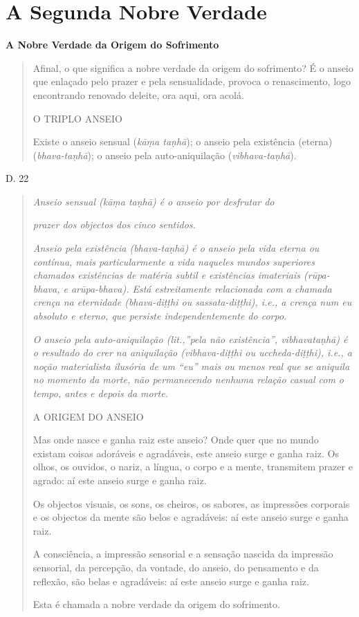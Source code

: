 \chapter{A Segunda Nobre Verdade}

\textbf{A Nobre Verdade da Origem do Sofrimento}

\begin{quote}
Afinal, o que significa a nobre verdade da origem do sofrimento? É o anseio que enlaçado pelo prazer e pela sensualidade, provoca o renascimento, logo encontrando renovado deleite, ora aqui, ora acolá.

O TRIPLO ANSEIO

Existe o anseio sensual (\emph{kāṃa taṇhā}); o anseio pela existência (eterna) (\emph{bhava-taṇhā}); o anseio pela auto-aniquilação (\emph{vibhava-taṇhā}).
\end{quote}

D. 22

\begin{quote}
\emph{Anseio sensual (kāṃa taṇhā) é o anseio por desfrutar do}

\emph{prazer dos objectos dos cinco sentidos.}

\emph{Anseio pela existência (bhava-taṇhā) é o anseio pela vida eterna ou contínua, mais particularmente a vida naqueles mundos superiores chamados existências de matéria subtil e existências imateriais (rūpa-bhava, e arūpa-bhava). Está estreitamente relacionada com a chamada crença na eternidade (bhava-diṭṭhi ou sassata-diṭṭhi), i.e., a crença num eu absoluto e eterno, que persiste independentemente do corpo.}

\emph{O anseio pela auto-aniquilação (lit.,''pela não existência'', vibhavataṇhā) é o resultado do crer na aniquilação (vibhava-diṭṭhi ou uccheda-diṭṭhi), i.e., a noção materialista ilusória de um ``eu'' mais ou menos real que se aniquila no momento da morte, não permanecendo nenhuma relação casual com o tempo, antes e depois da morte.}

A ORIGEM DO ANSEIO

Mas onde nasce e ganha raiz este anseio? Onde quer que no mundo existam coisas adoráveis e agradáveis, este anseio surge e ganha raiz. Os olhos, os ouvidos, o nariz, a língua, o corpo e a mente, transmitem prazer e agrado: aí este anseio surge e ganha raiz.

Os objectos visuais, os sons, os cheiros, os sabores, as impressões corporais e os objectos da mente são belos e agradáveis: aí este anseio surge e ganha raiz.

A consciência, a impressão sensorial e a sensação nascida da impressão sensorial, da percepção, da vontade, do anseio, do pensamento e da reflexão, são belas e agradáveis: aí este anseio surge e ganha raiz.

Esta é chamada a nobre verdade da origem do sofrimento.
\end{quote}


